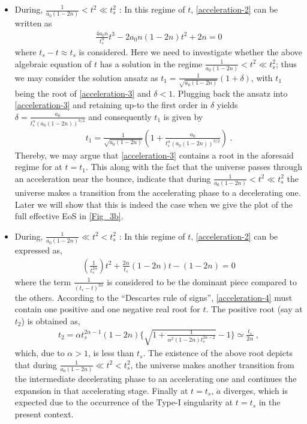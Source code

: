 \documentclass{article}
\begin{document}
\begin{itemize}
 \item During,  $\frac{1}{a_0\left(1 - 2n\right)} < t^2 \ll t_s^2$ : In this regime of $t$, \ref{acceleration-2} can be written as
 \begin{eqnarray}
  \frac{4a_0n}{t_s^{\alpha}}t^3 - 2a_0n\left(1 - 2n\right)t^2 + 2n = 0
  \label{acceleration-3}
 \end{eqnarray}
where $t_s - t \approx t_s$ is considered. Here we need to investigate whether the above algebraic equation of $t$ has a solution in the regime 
$\frac{1}{a_0\left(1 - 2n\right)} < t^2 \ll t_s^2$; thus we may consider the solution ansatz 
as $t_1 = \frac{1}{\sqrt{a_0\left(1-2n\right)}}\left(1 + \delta\right)$, with $t_1$ being the root of \ref{acceleration-3} and $\delta < 1$. 
Plugging back the ansatz into \ref{acceleration-3} and retaining up-to the first order in $\delta$ yields 
$\delta = \frac{a_0}{t_s^{\alpha}\left(a_0(1-2n)\right)^{3/2}}$ and consequently $t_1$ is given by
\begin{eqnarray}
 t_1 = \frac{1}{\sqrt{a_0\left(1-2n\right)}}\left(1 + \frac{a_0}{t_s^{\alpha}\left(a_0(1-2n)\right)^{3/2}}\right)~.
 \label{t1}
\end{eqnarray}
Thereby, we may argue that \ref{acceleration-3} contains a root in the aforesaid regime for at $t = t_1$. 
This along with the fact that the universe passes through an acceleration near the bounce, indicate 
that during $\frac{1}{a_0\left(1 - 2n\right)} < t^2 \ll t_s^2$ the universe makes a transition from the accelerating phase to a decelerating one. 
Later we will show that this is indeed the case when we give the plot of the full effective EoS in \ref{Fig_3b}. 

\item During,  $\frac{1}{a_0\left(1 - 2n\right)} \ll t^2 < t_s^2$ : In this regime of $t$, \ref{acceleration-2} can be expressed as,
\begin{eqnarray}
\left(\frac{1}{t_s^{2\alpha}}\right)t^2 + \frac{2\alpha}{t_s}\left(1 - 2n\right)t - \left(1 - 2n\right) = 0
\label{acceleration-4}
\end{eqnarray}
where the term $\frac{1}{\left(t_s - t\right)^{2\alpha}}$ is considered to be the dominant piece compared to the others. According to the 
``Descartes rule of signs'', \ref{acceleration-4} must contain one positive and one negative real root for $t$. The positive root (say at $t_2$) 
is obtained as,
\begin{eqnarray}
 t_2 = \alpha t_s^{2\alpha - 1}\left(1 - 2n\right)
 \bigg\{\sqrt{1 + \frac{1}{\alpha^2\left(1 - 2n\right)t_s^{2\alpha - 2}}} - 1\bigg\} \simeq \frac{t_s}{2\alpha}~,
 \label{acceleration-solution}
\end{eqnarray}
which, due to $\alpha > 1$, is less than $t_s$. The existence of the above root depicts that 
during $\frac{1}{a_0\left(1 - 2n\right)} \ll t^2 < t_s^2$, the universe makes another transition from the intermediate 
decelerating phase to an accelerating one and continues the expansion in that accelerating stage. Finally at $t = t_s$, 
$\ddot{a}$ diverges, which is expected due to the occurrence of the Type-I singularity at $t = t_s$ in the present context.\\ 

\end{itemize}
\end{document}
